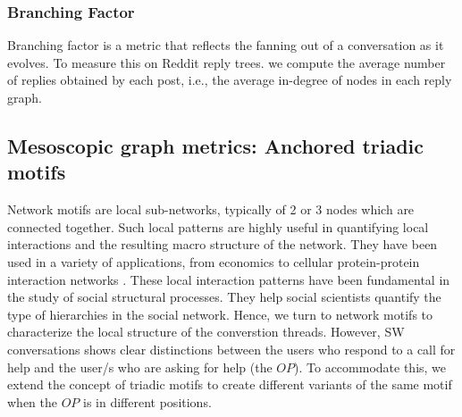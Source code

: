 
\subsubsection{Branching Factor}\label{sec:branching}
Branching factor is a metric that reflects the fanning out of a conversation as it evolves. To measure this on Reddit reply trees. we compute the average number of replies obtained by each post, i.e., the average in-degree of nodes in each reply graph. 


\subsection{Mesoscopic graph metrics: Anchored triadic motifs  } \label{sec:motif}
Network motifs are local sub-networks, typically of 2 or 3 nodes which are connected together. Such local patterns are highly useful in quantifying local interactions and the resulting macro structure of the network\cite{milo2002network}. They have been used in a variety of applications, from economics \cite{zhang2014dynamic} to cellular protein-protein interaction networks \cite{yeger2004network}. These local interaction patterns have been fundamental in the study of social structural processes\cite{faust20077}. They help social scientists quantify the type of hierarchies in the social network\cite{davis1967clustering,davis1967structure}. Hence, we turn to network motifs to characterize the local structure of the converstion threads. 
However, SW conversations shows clear distinctions between the users who respond to a call for help and the user/s who are asking for help (the $OP$). To accommodate this, we extend the concept of triadic motifs to create different variants of the same motif when the $OP$ is in different positions.


